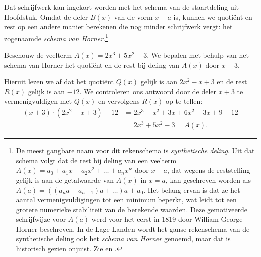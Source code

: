 \documentclass{ximera}
\begin{document}
\begin{algorithm}
Dat schrijfwerk kan ingekort worden met het schema van de staartdeling uit Hoofdstuk. Omdat de deler \(B(x)\) van de vorm \(x-a\) is, kunnen we quotiënt en rest op een andere manier berekenen die nog minder schrijfwerk vergt: het zogenaamde \textit{ schema van Horner}.\footnote{De meest gangbare naam voor dit rekenschema is \textit{ synthetische deling}. Uit dat schema volgt dat de rest bij deling van een veelterm \(A(x) = a_0 + a_1x + a_2x^2 + \dots + a_nx^n\) door \(x-a\), dat wegens de reststelling gelijk is aan de getalwaarde van \(A(x)\) in \(x=a\), kan geschreven worden als \(A(a) = ((a_n a +a_{n-1})a+\dots)a+a_0\). Het belang ervan is dat ze het aantal vermenigvuldigingen tot een minimum beperkt, wat leidt tot een grotere numerieke stabiliteit van de berekende waarden. Deze gemotiveerde schrijfwijze voor \(A(a)\) werd voor het eerst in 1819 door William George Horner beschreven. In de Lage Landen wordt het ganse rekenschema van de synthetische deling ook het \textit{ schema van Horner} genoemd, maar dat is historisch gezien onjuist. Zie \cite{Cajori} en \cite{wiki:Hornerschema}.} 
\renewcommand{\kolbreed}{\widthof{\(2 \cdot 30\)}}

\end{algorithm} 

\begin{example} 
Beschouw de veelterm \(A(x) = 2x^3 + 5x^2 - 3\). We bepalen met behulp van het schema van Horner het quotiënt en de rest bij deling van \(A(x)\) door \(x+3\). 
\renewcommand{\kolbreed}{\widthof{\(-3 \cdot (-1)\)}}

Hieruit lezen we af dat het quotiënt \(Q(x)\) gelijk is aan \(2x^2-x+3\) en de rest \(R(x)\) gelijk is aan \(-12\). We controleren ons antwoord door de deler \(x+3\) te vermenigvuldigen met \(Q(x)\) en vervolgens \(R(x)\) op te tellen:
\begin{align*}
(x+3)\cdot(2x^2-x+3) - 12 
& = 2x^3 - x^2 + 3x + 6x^2 - 3x + 9 - 12 \\
& = 2x^3 + 5x^2 - 3 = A(x).
\end{align*}
\end{example} 
\end{document}
